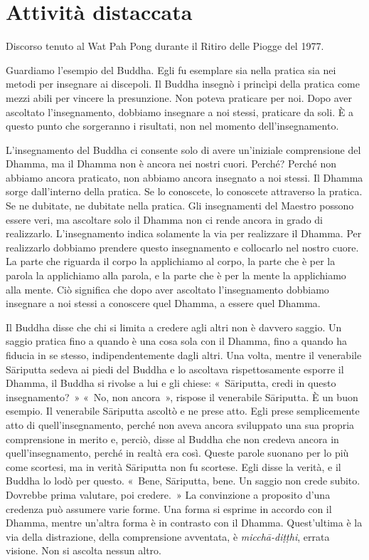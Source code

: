 \chapter{Attività distaccata}

\begin{openingQuote}
  \centering

  Discorso tenuto al Wat Pah Pong durante il Ritiro delle Piogge del 1977.
\end{openingQuote}

Guardiamo l'esempio del Buddha. Egli fu esemplare sia nella pratica sia
nei metodi per insegnare ai discepoli. Il Buddha insegnò i princìpi
della pratica come mezzi abili per vincere la presunzione. Non poteva
praticare per noi. Dopo aver ascoltato l'insegnamento, dobbiamo
insegnare a noi stessi, praticare da soli. È a questo punto che
sorgeranno i risultati, non nel momento dell'insegnamento.

L'insegnamento del Buddha ci consente solo di avere un'iniziale
comprensione del Dhamma, ma il Dhamma non è ancora nei nostri cuori.
Perché? Perché non abbiamo ancora praticato, non abbiamo ancora
insegnato a noi stessi. Il Dhamma sorge dall'interno della pratica. Se
lo conoscete, lo conoscete attraverso la pratica. Se ne dubitate, ne
dubitate nella pratica. Gli insegnamenti del Maestro possono essere
veri, ma ascoltare solo il Dhamma non ci rende ancora in grado di
realizzarlo. L'insegnamento indica solamente la via per realizzare il
Dhamma. Per realizzarlo dobbiamo prendere questo insegnamento e
collocarlo nel nostro cuore. La parte che riguarda il corpo la
applichiamo al corpo, la parte che è per la parola la applichiamo alla
parola, e la parte che è per la mente la applichiamo alla mente. Ciò
significa che dopo aver ascoltato l'insegnamento dobbiamo insegnare a
noi stessi a conoscere quel Dhamma, a essere quel Dhamma.

Il Buddha disse che chi si limita a credere agli altri non è davvero
saggio. Un saggio pratica fino a quando è una cosa sola con il Dhamma,
fino a quando ha fiducia in se stesso, indipendentemente dagli altri.
Una volta, mentre il venerabile Sāriputta sedeva ai piedi del Buddha e
lo ascoltava rispettosamente esporre il Dhamma, il Buddha si rivolse a
lui e gli chiese: «~Sāriputta, credi in questo insegnamento?~» «~No, non
ancora~», rispose il venerabile Sāriputta. È un buon esempio. Il
venerabile Sāriputta ascoltò e ne prese atto. Egli prese semplicemente
atto di quell'insegnamento, perché non aveva ancora sviluppato una sua
propria comprensione in merito e, perciò, disse al Buddha che non
credeva ancora in quell'insegnamento, perché in realtà era così. Queste
parole suonano per lo più come scortesi, ma in verità Sāriputta non fu
scortese. Egli disse la verità, e il Buddha lo lodò per questo. «~Bene,
Sāriputta, bene. Un saggio non crede subito. Dovrebbe prima valutare,
poi credere.~» La convinzione a proposito d'una credenza può assumere
varie forme. Una forma si esprime in accordo con il Dhamma, mentre
un'altra forma è in contrasto con il Dhamma. Quest'ultima è la via della
distrazione, della comprensione avventata, è \emph{micchā-diṭṭhi},
errata visione. Non si ascolta nessun altro.

